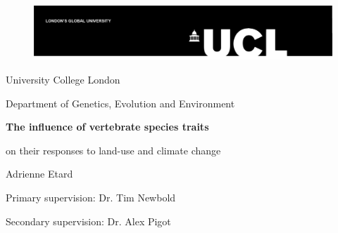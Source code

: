 \date{\today}

\begin{titlepage}

\begin{figure}
{\includegraphics[scale=0.8]{figures/UCL_logo}}
\end{figure}

\begin{center}

{\Large
University College London\par
Department of Genetics, Evolution and Environment\par
}
%
\vskip 6cm
%
{\huge \bf
The influence of vertebrate species traits  \par
on their responses to land-use and climate change\par
}
%
\vskip 4cm
%
{\Large
Adrienne Etard\par
\vskip 1cm
Primary supervision: Dr. Tim Newbold\par
Secondary supervision: Dr. Alex Pigot

\vskip 2cm

\makeatletter
\@date
}
%
\vskip 3cm
%
{\large
 }
\vfil
\end{center}
\end{titlepage}

\makeatother